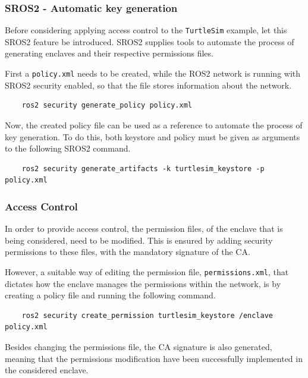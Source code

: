 \subsubsection{SROS2 - Automatic key generation}
            
Before considering applying access control to the \texttt{TurtleSim} example, let this SROS2 feature be introduced. SROS2 supplies tools to automate the process of generating enclaves and their respective permissions files. 

First a \texttt{policy.xml} needs to be created, while the ROS2 network is running with SROS2 security enabled, so that the file stores information about the network. 
                
\begin{verbatim}
    ros2 security generate_policy policy.xml
\end{verbatim}

Now, the created policy file can be used as a reference to automate the process of key generation. To do this, both keystore and policy must be given as arguments to the following SROS2 command.

\begin{verbatim}
    ros2 security generate_artifacts -k turtlesim_keystore -p policy.xml
\end{verbatim}

\subsubsection{Access Control}
            
In order to provide access control, the permission files, of the enclave that is being considered, need to be modified. This is ensured by adding security permissions to these files, with the mandatory signature of the CA. 
                
However, a suitable way of editing the permission file, \texttt{permissions.xml}, that dictates how the enclave manages the permissions within the network, is by creating a policy file and running the following command.
                
\begin{verbatim}
    ros2 security create_permission turtlesim_keystore /enclave policy.xml
\end{verbatim}
    
Besides changing the permissions file, the CA signature is also generated, meaning that the permissions modification have been successfully implemented in the considered enclave.


